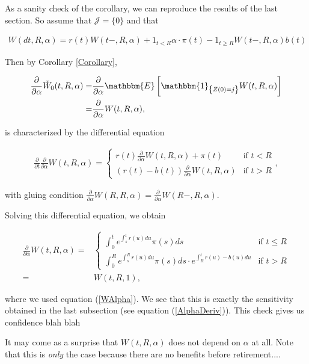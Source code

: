 \documentclass{book}
\newcommand{\1}[1]{\mathbbm{1}_{\left\lbrace #1 \right\rbrace}}
\newcommand{\expec}[1][def]{\mathbbm{E} \left[ #1 \right]}
\theoremstyle{break}
\theoremstyle{remark}
\numberwithin{equation}{section}
\begin{document}
\begin{example}
	As a sanity check of the corollary, we can reproduce the results of the last section. So assume that $\mathcal{J} = \{ 0 \}$ and that
	
	\begin{align*}
		W(dt,R,\alpha) = r(t) W(t-,R,\alpha) + 1_{t<R} \alpha \cdot \pi(t) - 1_{t \geq R} W(t-,R,\alpha) b(t)
	\end{align*}

	Then by Corollary \ref{Corollary},
	
	\begin{align*}
		\frac{\partial}{\partial \alpha} \tilde{W}_0(t,R,\alpha) =&  \frac{\partial}{\partial \alpha} \expec[\1{Z(0)=j} W(t,R,\alpha)] \\
		=&\frac{\partial}{\partial \alpha} W(t,R,\alpha),
	\end{align*}

	is characterized by the differential equation
	
	\begin{align*}
		\frac{\partial}{\partial t} \frac{\partial}{\partial \alpha} W(t,R,\alpha) = \left\{
		\begin{array}{ll}
			r(t) \frac{\partial}{\partial \alpha} W(t,R,\alpha) + \pi(t) & \mbox{if } t < R \\
			\left( r(t) - b(t) \right) \frac{\partial}{\partial \alpha} W(t,R,\alpha) & \mbox{if } t > R
		\end{array}
		\right.,
	\end{align*}

	with gluing condition $\frac{\partial}{\partial \alpha} W(R,R,\alpha) = \frac{\partial}{\partial \alpha} W(R-,R,\alpha)$.
	
	Solving this differential equation, we obtain
	
	\begin{align*}
	\frac{\partial}{\partial \alpha} W(t,R,\alpha) =& \left\{
		\begin{array}{ll}
			\int_0^t e^{\int_s^t r(u) du} \pi(s) ds & \mbox{if } t \leq R \\
			\int_0^R e^{\int_s^R r(u) du} \pi(s) ds \cdot e^{\int_R^t r(u) - b(u) du} & \mbox{if } t > R
		\end{array}
		\right. \\
		=& W(t,R,1),
	\end{align*}

	where we used equation (\ref{WAlpha}). We see that this is exactly the sensitivity obtained in the last subsection (see equation (\ref{AlphaDeriv})). This check gives us confidence blah blah
	
	It may come as a surprise that $W(t,R,\alpha)$ does not depend on $\alpha$ at all. Note that this is \textit{only} the case because there are no benefits before retirement....
\end{example}
\end{document}
